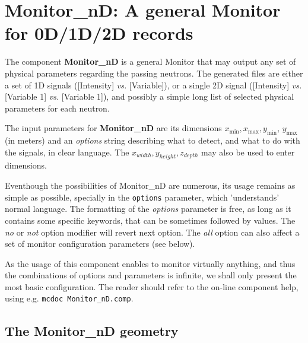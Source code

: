 \section{Monitor\_nD: A general Monitor for 0D/1D/2D records}
\label{s:monitornd}


The component \textbf{Monitor\_nD} is a general Monitor that may output any
set of physical parameters regarding the passing neutrons. The
generated files are either a set of 1D signals ([Intensity] \textit{vs.}
[Variable]), or a single 2D signal ([Intensity] \textit{vs.} [Variable 1]
\textit{vs.} [Variable 1]), and possibly a simple long list of selected
physical parameters for each neutron.

The input parameters for \textbf{Monitor\_nD} are its dimensions $x_\textrm{
  min}, x_\textrm{max}, y_\textrm{min}$, $y_\textrm{max}$ (in meters) and an \textit{
  options} string describing what to detect, and what to do with the
signals, in clear language. The $x_{width}, y_{height}, z_{depth}$ may also be used to enter dimensions.

Eventhough the possibilities of Monitor\_nD are numerous, its usage remains as simple as possible, specially in the \verb+options+ parameter, which 'understands' normal language.
The formatting of the \textit{options}
parameter is free, as long as it contains some specific keywords, that
can be sometimes followed by values. The \textit{no} or \textit{not} option
modifier will revert next option. The \textit{all} option can also affect a
set of monitor configuration parameters (see below).

As the usage of this component enables to monitor virtually anything, and thus the combinations of options and parameters is infinite, we shall only present the most basic configuration. The reader should refer to the on-line component help, using e.g. \verb+mcdoc Monitor_nD.comp+.

\subsection{The Monitor\_nD geometry}

